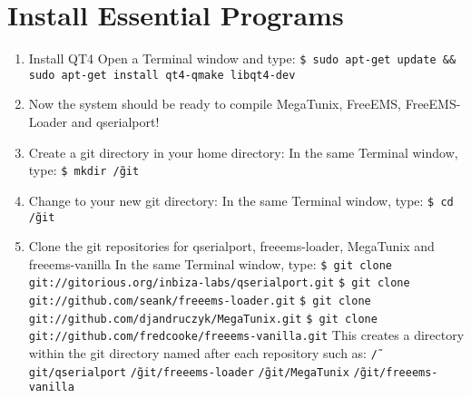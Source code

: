 \documentclass[12pt,notitlepage,onecolumn,oneside,openany]{memoir}
\begin{document}
\chapter{\textsf{Install Essential Programs}}

\begin{enumerate}
\item \textsf{Install QT4} \newline
      \textsf{Open a Terminal window and type:} \newline
      \texttt{\$ sudo apt-get update \&\& sudo apt-get install qt4-qmake libqt4-dev}

\item \textsf{Now the system should be ready to compile MegaTunix, FreeEMS, FreeEMS-Loader and qserialport!}

\item \textsf{Create a git directory in your home directory:} \newline
      \textsf{In the same Terminal window, type:} \newline
      \texttt{\$ mkdir \~/git}

\item \textsf{Change to your new git directory:} \newline
      \textsf{In the same Terminal window, type:} \newline
      \texttt{\$ cd \~/git}

\item \textsf{Clone the git repositories for qserialport, freeems-loader, MegaTunix and freeems-vanilla} \newline
      \textsf{In the same Terminal window, type:} \newline
      \texttt{\$ git clone git://gitorious.org/inbiza-labs/qserialport.git} \newline
      \texttt{\$ git clone git://github.com/seank/freeems-loader.git} \newline
      \texttt{\$ git clone git://github.com/djandruczyk/MegaTunix.git} \newline
      \texttt{\$ git clone git://github.com/fredcooke/freeems-vanilla.git} \newline
      \newline
      \textsf{This creates a directory within the git directory named after each repository such as:} \newline
      \texttt{\~/git/qserialport} \newline	
      \texttt{\~/git/freeems-loader} \newline
      \texttt{\~/git/MegaTunix} \newline
      \texttt{\~/git/freeems-vanilla}


\end{enumerate}
\end{document}
